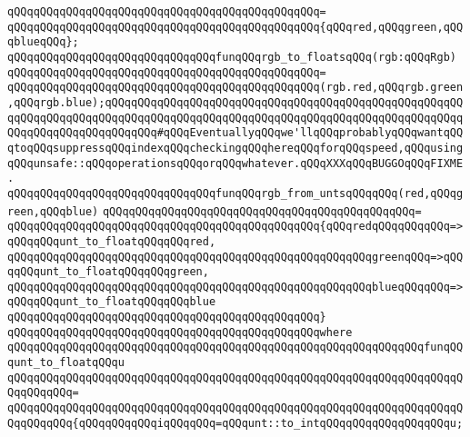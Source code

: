 \verb|qQQqqQQqqQQqqQQqqQQqqQQqqQQqqQQqqQQqqQQqqQQqqQQq=|\newline
\verb|qQQqqQQqqQQqqQQqqQQqqQQqqQQqqQQqqQQqqQQqqQQqqQQq{qQQqred,qQQqgreen,qQQqblueqQQq};|\newline
\newline
\verb|qQQqqQQqqQQqqQQqqQQqqQQqqQQqqQQqfunqQQqrgb_to_floatsqQQq(rgb:qQQqRgb)|\newline
\verb|qQQqqQQqqQQqqQQqqQQqqQQqqQQqqQQqqQQqqQQqqQQqqQQq=|\newline
\verb|qQQqqQQqqQQqqQQqqQQqqQQqqQQqqQQqqQQqqQQqqQQqqQQq(rgb.red,qQQqrgb.green,qQQqrgb.blue);qQQqqQQqqQQqqQQqqQQqqQQqqQQqqQQqqQQqqQQqqQQqqQQqqQQqqQQqqQQqqQQqqQQqqQQqqQQqqQQqqQQqqQQqqQQqqQQqqQQqqQQqqQQqqQQqqQQqqQQqqQQqqQQqqQQqqQQqqQQqqQQqqQQq#qQQqEventuallyqQQqwe'llqQQqprobablyqQQqwantqQQqtoqQQqsuppressqQQqindexqQQqcheckingqQQqhereqQQqforqQQqspeed,qQQqusingqQQqunsafe::qQQqoperationsqQQqorqQQqwhatever.qQQqXXXqQQqBUGGOqQQqFIXME.|\newline
\newline
\newline
\newline
\verb|qQQqqQQqqQQqqQQqqQQqqQQqqQQqqQQqfunqQQqrgb_from_untsqQQqqQQq(red,qQQqgreen,qQQqblue)|\newline
\verb|qQQqqQQqqQQqqQQqqQQqqQQqqQQqqQQqqQQqqQQqqQQqqQQq=|\newline
\verb|qQQqqQQqqQQqqQQqqQQqqQQqqQQqqQQqqQQqqQQqqQQqqQQq{qQQqredqQQqqQQqqQQq=>qQQqqQQqunt_to_floatqQQqqQQqred,|\newline
\verb|qQQqqQQqqQQqqQQqqQQqqQQqqQQqqQQqqQQqqQQqqQQqqQQqqQQqqQQqgreenqQQq=>qQQqqQQqunt_to_floatqQQqqQQqgreen,|\newline
\verb|qQQqqQQqqQQqqQQqqQQqqQQqqQQqqQQqqQQqqQQqqQQqqQQqqQQqqQQqblueqQQqqQQq=>qQQqqQQqunt_to_floatqQQqqQQqblue|\newline
\verb|qQQqqQQqqQQqqQQqqQQqqQQqqQQqqQQqqQQqqQQqqQQqqQQq}|\newline
\verb|qQQqqQQqqQQqqQQqqQQqqQQqqQQqqQQqqQQqqQQqqQQqqQQqwhere|\newline
\verb|qQQqqQQqqQQqqQQqqQQqqQQqqQQqqQQqqQQqqQQqqQQqqQQqqQQqqQQqqQQqqQQqfunqQQqunt_to_floatqQQqu|\newline
\verb|qQQqqQQqqQQqqQQqqQQqqQQqqQQqqQQqqQQqqQQqqQQqqQQqqQQqqQQqqQQqqQQqqQQqqQQqqQQqqQQq=|\newline
\verb|qQQqqQQqqQQqqQQqqQQqqQQqqQQqqQQqqQQqqQQqqQQqqQQqqQQqqQQqqQQqqQQqqQQqqQQqqQQqqQQq{qQQqqQQqqQQqiqQQqqQQq=qQQqunt::to_intqQQqqQQqqQQqqQQqqQQqu;|\newline
\newline
